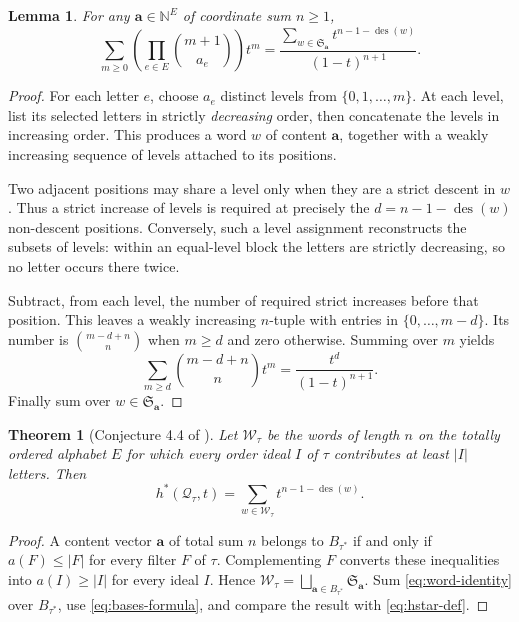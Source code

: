 \documentclass[11pt,letterpaper]{article}
\newtheorem{theorem}{Theorem}[section]
\newtheorem{lemma}[lemma]{Lemma}
\theoremstyle{definition}
\newcommand{\N}{\mathbb N}
\newcommand{\avec}{\mathbf a}
\newcommand{\WW}{\mathcal W}
\newcommand{\QQ}{\mathcal Q}
\DeclareMathOperator{\des}{des}
\newcommand{\card}[1]{\lvert #1\rvert}
\begin{document}
\begin{lemma}\label{lem:word}
For any $\avec\in\N^E$ of coordinate sum $n\geq1$,
\begin{equation}\label{eq:word-identity}
 \sum_{m\geq0}\left(\prod_{e\in E}\binom{m+1}{a_e}\right)t^m
 =\frac{\displaystyle\sum_{w\in\mathfrak S_\avec}
                          t^{n-1-\des(w)}}{(1-t)^{n+1}}.
\end{equation}
\end{lemma}
\begin{proof}
For each letter $e$, choose $a_e$ distinct levels from
$\{0,1,\ldots,m\}$. At each level, list its selected letters in strictly
\emph{decreasing} order, then concatenate the levels in increasing order.
This produces a word $w$ of content $\avec$, together with a weakly
increasing sequence of levels attached to its positions.

Two adjacent positions may share a level only when they are a strict
descent in $w$. Thus a strict increase of levels is required at precisely
the $d=n-1-\des(w)$ non-descent positions. Conversely, such a level
assignment reconstructs the subsets of levels: within an equal-level block
the letters are strictly decreasing, so no letter occurs there twice.

Subtract, from each level, the number of required strict increases before
that position. This leaves a weakly increasing $n$-tuple with entries in
$\{0,\ldots,m-d\}$. Its number is
$\binom{m-d+n}{n}$ when $m\geq d$ and zero otherwise. Summing over $m$
yields
\[
 \sum_{m\geq d}\binom{m-d+n}{n}t^m
 =\frac{t^d}{(1-t)^{n+1}}.
\]
Finally sum over $w\in\mathfrak S_\avec$.
\end{proof}

\begin{theorem}[Conjecture 4.4 of \cite{AC26}]\label{thm:hstar}
Let $\WW_\tau$ be the words of length $n$ on the totally ordered alphabet
$E$ for which every order ideal $I$ of $\tau$ contributes at least
$\card I$ letters. Then
\begin{equation}\label{eq:hstar-word}
 \boxed{h^*(\QQ_\tau,t)=\sum_{w\in\WW_\tau}t^{n-1-\des(w)}.}
\end{equation}
\end{theorem}
\begin{proof}
A content vector $\avec$ of total sum $n$ belongs to $B_{\tau^*}$ if and
only if $a(F)\leq\card F$ for every filter $F$ of $\tau$. Complementing
$F$ converts these inequalities into $a(I)\geq\card I$ for every ideal
$I$. Hence
$\WW_\tau=\bigsqcup_{\avec\in B_{\tau^*}}\mathfrak S_\avec$.
Sum \eqref{eq:word-identity} over $B_{\tau^*}$, use
\eqref{eq:bases-formula}, and compare the result with
\eqref{eq:hstar-def}.
\end{proof}
\end{document}

